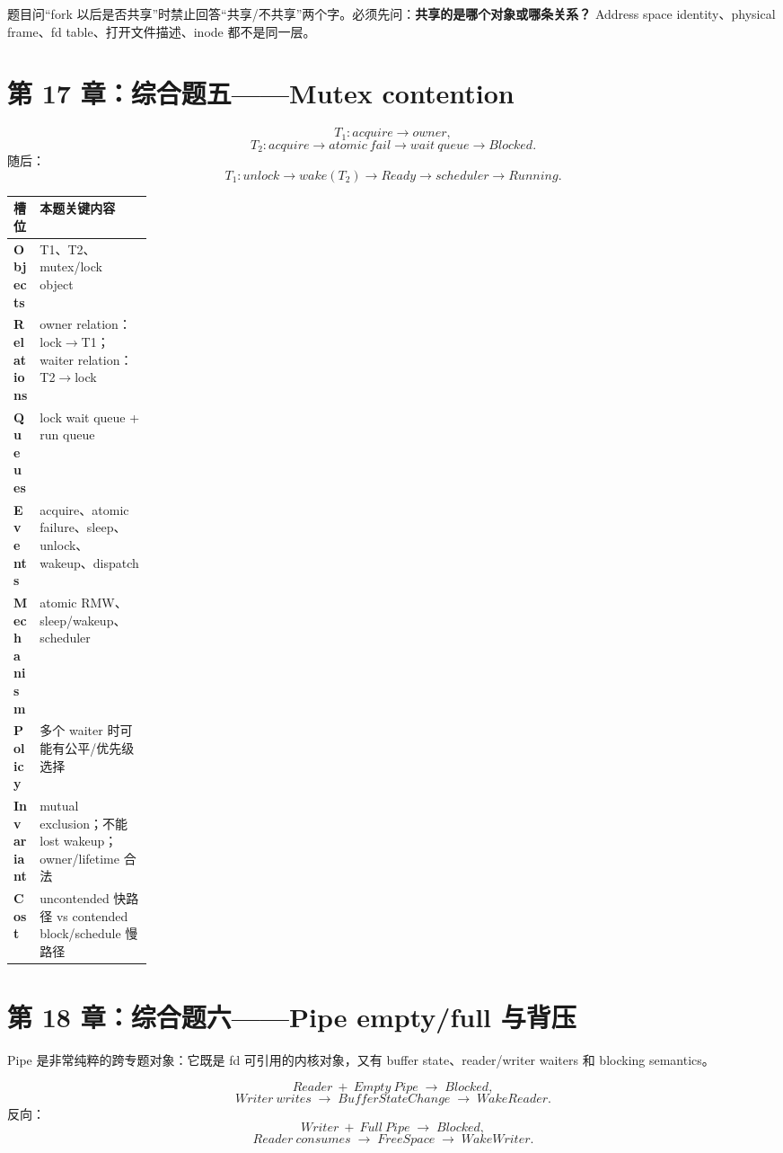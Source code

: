 \documentclass[11pt,a4paper]{ctexart}
\newcommand{\kw}[1]{\textbf{#1}}
\newcommand{\arr}{\;\longrightarrow\;}
\begin{document}
\begin{exam}[跨专题识别点]
题目问“fork 以后是否共享”时禁止回答“共享/不共享”两个字。必须先问：\kw{共享的是哪个对象或哪条关系？} Address space identity、physical frame、fd table、打开文件描述、inode 都不是同一层。
\end{exam}

\section{第 17 章：综合题五——Mutex contention}

\[
T_1:acquire\rightarrow owner,
\]
\[
T_2:acquire\rightarrow atomic\ fail\rightarrow wait\ queue\rightarrow Blocked.
\]
随后：
\[
T_1:unlock\rightarrow wake(T_2)\rightarrow Ready\rightarrow scheduler\rightarrow Running.
\]

\begin{center}
\small
\begin{tabularx}{\linewidth}{>{\bfseries}p{0.18\linewidth} X}
\toprule
槽位 & 本题关键内容 \\
\midrule
Objects & T1、T2、mutex/lock object \\
Relations & owner relation：lock$\to$T1；waiter relation：T2$\to$lock \\
Queues & lock wait queue + run queue \\
Events & acquire、atomic failure、sleep、unlock、wakeup、dispatch \\
Mechanism & atomic RMW、sleep/wakeup、scheduler \\
Policy & 多个 waiter 时可能有公平/优先级选择 \\
Invariant & mutual exclusion；不能 lost wakeup；owner/lifetime 合法 \\
Cost & uncontended 快路径 vs contended block/schedule 慢路径 \\
\bottomrule
\end{tabularx}
\end{center}

\section{第 18 章：综合题六——Pipe empty/full 与背压}

Pipe 是非常纯粹的跨专题对象：它既是 fd 可引用的内核对象，又有 buffer state、reader/writer waiters 和 blocking semantics。

\[
Reader\ +\ Empty\ Pipe\arr Blocked,
\]
\[
Writer\ writes\arr BufferStateChange\arr WakeReader.
\]
反向：
\[
Writer\ +\ Full\ Pipe\arr Blocked,
\]
\[
Reader\ consumes\arr FreeSpace\arr WakeWriter.
\]
\end{document}
